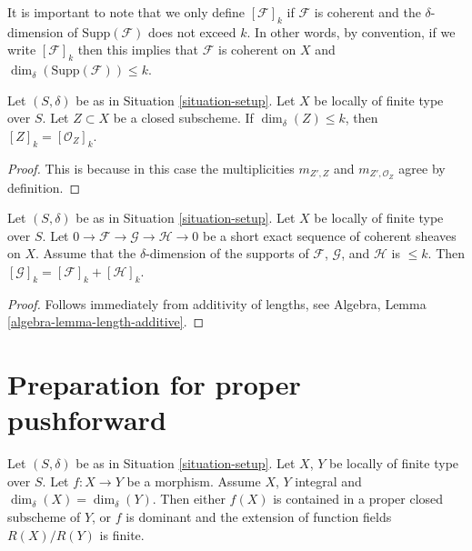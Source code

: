 \noindent
It is important to note that we only define $[\mathcal{F}]_k$
if $\mathcal{F}$ is coherent and the $\delta$-dimension
of $\text{Supp}(\mathcal{F})$ does not exceed $k$. In other words,
by convention, if we write $[\mathcal{F}]_k$ then this implies that
$\mathcal{F}$ is coherent on $X$ and
$\dim_\delta(\text{Supp}(\mathcal{F})) \leq k$.

\begin{lemma}
\label{lemma-cycle-closed-coherent}
Let $(S, \delta)$ be as in Situation \ref{situation-setup}.
Let $X$ be locally of finite type over $S$.
Let $Z \subset X$ be a closed subscheme.
If $\dim_\delta(Z) \leq k$, then $[Z]_k = [{\mathcal O}_Z]_k$.
\end{lemma}

\begin{proof}
This is because in this case the multiplicities $m_{Z', Z}$ and
$m_{Z', \mathcal{O}_Z}$ agree by definition.
\end{proof}

\begin{lemma}
\label{lemma-additivity-sheaf-cycle}
Let $(S, \delta)$ be as in Situation \ref{situation-setup}.
Let $X$ be locally of finite type over $S$.
Let $0 \to \mathcal{F} \to \mathcal{G} \to \mathcal{H} \to 0$
be a short exact sequence of coherent sheaves on $X$.
Assume that the $\delta$-dimension of the supports
of $\mathcal{F}$, $\mathcal{G}$, and $\mathcal{H}$ is $\leq k$.
Then $[\mathcal{G}]_k = [\mathcal{F}]_k + [\mathcal{H}]_k$.
\end{lemma}

\begin{proof}
Follows immediately from additivity of lengths, see
Algebra, Lemma \ref{algebra-lemma-length-additive}.
\end{proof}









\section{Preparation for proper pushforward}
\label{section-preparation-pushforward}

\begin{lemma}
\label{lemma-equal-dimension}
Let $(S, \delta)$ be as in Situation \ref{situation-setup}.
Let $X$, $Y$ be locally of finite type over $S$.
Let $f : X \to Y$ be a morphism.
Assume $X$, $Y$ integral and $\dim_\delta(X) = \dim_\delta(Y)$.
Then either $f(X)$ is contained in a proper closed subscheme
of $Y$, or $f$ is dominant and the extension of function fields
$R(X)/R(Y)$ is finite.
\end{lemma}

